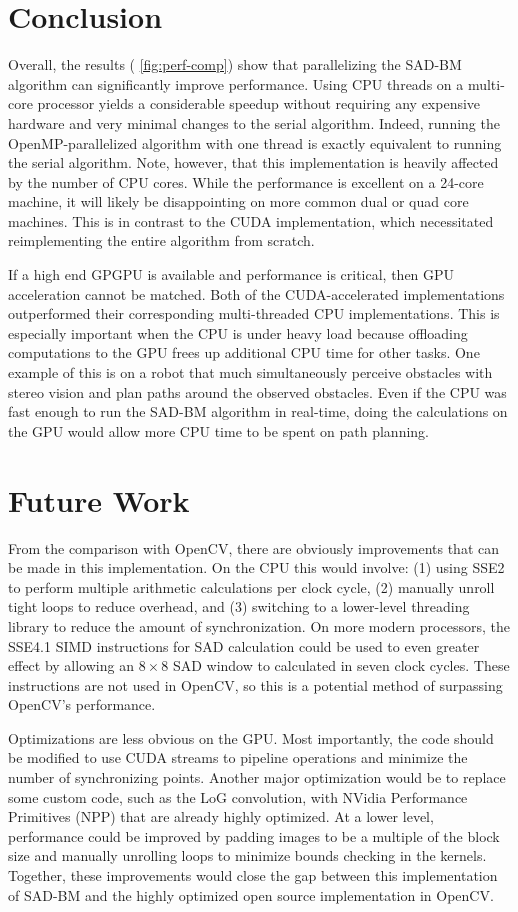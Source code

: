 \documentclass{article}
\let\orgautoref\autoref
\providecommand{\Autoref}
        {\def\equationautorefname{Equation}%
         \def\figureautorefname{Figure}%
         \def\subfigureautorefname{Figure}%
         \def\Itemautorefname{Item}%
         \def\tableautorefname{Table}%
         \def\sectionautorefname{Section}%
         \def\subsectionautorefname{Section}%
         \def\subsubsectionautorefname{Section}%
         \def\chapterautorefname{Section}%
         \def\partautorefname{Part}%
         \orgautoref}
\begin{document}
\section{Conclusion}
\label{sec:conc}
Overall, the results (\Autoref{fig:perf-comp}) show that parallelizing the
SAD-BM algorithm can significantly improve performance. Using CPU threads on a
multi-core processor yields a considerable speedup without requiring any
expensive hardware and very minimal changes to the serial algorithm. Indeed,
running the OpenMP-parallelized algorithm with one thread is exactly equivalent
to running the serial algorithm. Note, however, that this implementation is
heavily affected by the number of CPU cores. While the performance is excellent
on a 24-core machine, it will likely be disappointing on more common dual or
quad core machines. This is in contrast to the CUDA implementation, which
necessitated reimplementing the entire algorithm from scratch.

If a high end GPGPU is available and performance is critical, then GPU
acceleration cannot be matched. Both of the CUDA-accelerated implementations
outperformed their corresponding multi-threaded CPU implementations. This is
especially important when the CPU is under heavy load because offloading
computations to the GPU frees up additional CPU time for other tasks. One
example of this is on a robot that much simultaneously perceive obstacles with
stereo vision and plan paths around the observed obstacles. Even if the CPU was
fast enough to run the SAD-BM algorithm in real-time, doing the calculations on
the GPU would allow more CPU time to be spent on path planning.

\section{Future Work}
\label{sec:future}
From the comparison with OpenCV, there are obviously improvements that can be
made in this implementation. On the CPU this would involve: (1) using SSE2 to
perform multiple arithmetic calculations per clock cycle, (2) manually unroll
tight loops to reduce overhead, and (3) switching to a lower-level threading
library to reduce the amount of synchronization. On more modern processors, the
SSE4.1 SIMD instructions for SAD calculation could be used to even greater
effect by allowing an $8 \times 8$ SAD window to calculated in seven clock
cycles. These instructions are not used in OpenCV, so this is a potential
method of surpassing OpenCV's performance.

Optimizations are less obvious on the GPU. Most importantly, the code should be
modified to use CUDA streams to pipeline operations and minimize the number of
synchronizing points. Another major optimization would be to replace some
custom code, such as the LoG convolution, with NVidia Performance Primitives
(NPP) that are already highly optimized. At a lower level, performance could be
improved by padding images to be a multiple of the block size and manually
unrolling loops to minimize bounds checking in the kernels. Together, these
improvements would close the gap between this implementation of SAD-BM and the
highly optimized open source implementation in OpenCV.
\end{document}
